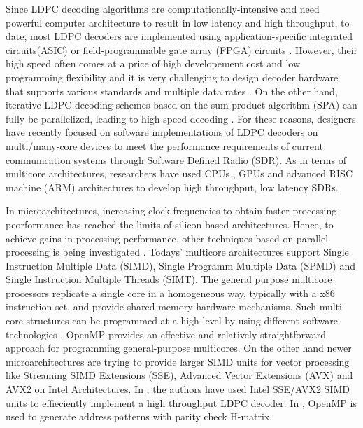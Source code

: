 \documentclass[conference]{IEEEtran}
\begin{document}
Since LDPC decoding algorithms are computationally-intensive and need powerful computer architecture to result in low latency and high throughput, to date, most LDPC decoders are implemented using application-specific integrated circuits(ASIC) or field-programmable gate array (FPGA) circuits \cite{art_ldpc_OpenCl_1}. However, their high speed often comes at a price of high developement cost and low programming flexibility \cite{art_convolutional} and it is very challenging to design decoder hardware that supports various standards and multiple data rates \cite{art_cuda_openmp}. On the other hand, iterative LDPC decoding schemes based on the sum-product algorithm (SPA) can fully be parallelized, leading to high-speed decoding \cite{art_shannon}. For these reasons, designers have recently focused on software implementations of LDPC decoders on multi/many-core devices \cite{art_massively} to meet the performance requirements of current communication systems through Software Defined Radio (SDR). As in terms of multicore architectures, researchers have used CPUs \cite{art_cpu_gpu, art_ldpc_cpu0}, GPUs \cite{art_memory_coalesced, art_massively, art_optimize_0} and advanced RISC machine (ARM) \cite{art_ldpc_cpu0, art_neon} architectures to develop high throughput, low latency SDRs. 

In microarchitectures, increasing clock frequencies to obtain faster processing peorformance has reached the limits of silicon based architectures. Hence, to achieve gains in processing performance, other techniques based on parallel processing is being investigated \cite{art_ldpc_cpu1}. Todays' multicore architectures support Single Instruction Multiple Data (SIMD), Single Programm Multiple Data (SPMD) and Single Instruction Multiple Threads (SIMT). The general purpose multicore processors replicate a single core in a homogeneous way, typically with a x86 instruction set, and provide shared memory hardware mechanisms\cite{art_massively}. Such multi-core structures can be programmed at a high level by using different software technologies \cite{art_multicore_techs}. OpenMP \cite{art_openMp_book} provides an effective and relatively straightforward approach for programming general-purpose multicores. On the other hand newer microarchitectures are trying to provide larger SIMD units for vector processing like Streaming SIMD Extensions (SSE), Advanced Vector Extensions (AVX) and AVX2 \cite{art_intel_sse} on Intel Architectures. In \cite{art_ldpc_cpu1}, the authors have used Intel SSE/AVX2 SIMD units to effieciently implement a high throughput LDPC decoder. In \cite{art_cuda_openmp}, OpenMP is used to generate address patterns with parity check H-matrix.
\end{document}
